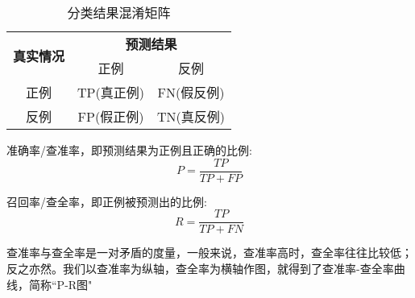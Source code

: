 \begin{table}[H]
    \centering
    \caption{分类结果混淆矩阵}
    \label{table:分类结果混淆矩阵}
    \setlength{\tabcolsep}{7mm}
    \begin{tabular}{c|c|c}
        \toprule
        \multirow{2}{*}{\textbf{真实情况}} &  \multicolumn{2}{c}{\textbf{预测结果}} \\ \cline{2-3}
        & 正例 & 反例  \\ 
        \midrule
        正例 & TP(真正例) & FN(假反例) \\
        反例 & FP(假正例) & TN(真反例) \\
        \bottomrule
    \end{tabular}
\end{table}

准确率/查准率，即预测结果为正例且正确的比例:
\begin{equation}
    P = \frac{TP}{TP+FP}
\end{equation}

召回率/查全率，即正例被预测出的比例:
\begin{equation}
    R = \frac{TP}{TP+FN}
\end{equation}

查准率与查全率是一对矛盾的度量，一般来说，查准率高时，查全率往往比较低；反之亦然。我们以查准率为纵轴，查全率为横轴作图，就得到了查准率-查全率曲线，简称``P-R图"

